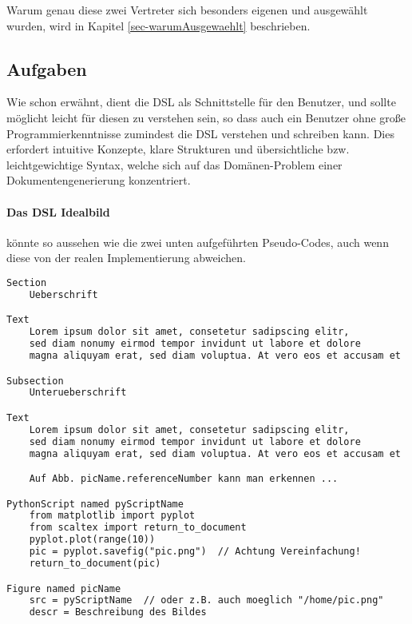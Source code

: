 Warum genau diese zwei Vertreter sich besonders eigenen und ausgewählt wurden,
wird in Kapitel \ref{sec-warumAusgewaehlt} beschrieben.

\subsection{Aufgaben}

Wie schon erwähnt, dient die DSL als Schnittstelle für den Benutzer,
und sollte möglicht leicht für diesen zu verstehen sein, so dass
auch ein Benutzer ohne große Programmierkenntnisse zumindest die
DSL verstehen und schreiben kann. Dies erfordert intuitive Konzepte,
klare Strukturen und übersichtliche bzw. leichtgewichtige Syntax, welche
sich auf das Domänen-Problem einer Dokumentengenerierung konzentriert.

\paragraph{Das DSL Idealbild} könnte so aussehen wie die zwei unten
aufgeführten Pseudo-Codes, auch wenn diese von der
realen Implementierung abweichen. %

\begin{lstlisting}[language=TeX]
Section
    Ueberschrift

Text
    Lorem ipsum dolor sit amet, consetetur sadipscing elitr,
    sed diam nonumy eirmod tempor invidunt ut labore et dolore
    magna aliquyam erat, sed diam voluptua. At vero eos et accusam et

Subsection
    Unterueberschrift

Text
    Lorem ipsum dolor sit amet, consetetur sadipscing elitr,
    sed diam nonumy eirmod tempor invidunt ut labore et dolore
    magna aliquyam erat, sed diam voluptua. At vero eos et accusam et

    Auf Abb. picName.referenceNumber kann man erkennen ...

PythonScript named pyScriptName
    from matplotlib import pyplot
    from scaltex import return_to_document
    pyplot.plot(range(10))
    pic = pyplot.savefig("pic.png")  // Achtung Vereinfachung!
    return_to_document(pic)

Figure named picName
    src = pyScriptName  // oder z.B. auch moeglich "/home/pic.png"
    descr = Beschreibung des Bildes
\end{lstlisting}

